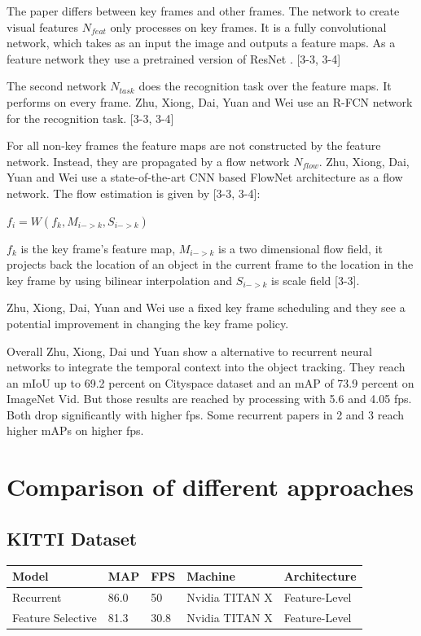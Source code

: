 \documentclass[conference]{IEEEtran}
\begin{document}
The paper differs between key frames and other frames. The network to create visual features $ N_{feat} $ only processes on key frames. It is a fully convolutional network, which takes as an input the image and outputs a feature maps. As a feature network they use a pretrained version of ResNet \cite{b40}. [3-3, 3-4] \newline

The second network $ N_{task} $ does the recognition task over the feature maps. It performs on every frame.  Zhu, Xiong, Dai, Yuan and Wei use an R-FCN \cite{b19} network for the recognition task. [3-3, 3-4]  \newline

For all non-key frames the feature maps are not constructed by the feature network. Instead, they are propagated by a flow network $ N_{flow} $.  Zhu, Xiong, Dai, Yuan and Wei use a state-of-the-art CNN based FlowNet architecture \cite{b57} as a flow network. The flow estimation is given by [3-3, 3-4]: \newline

$ f_{i} =  W (f_{k},M_{i->k}, S_{i->k})$ \newline

$ f_{k} $ is the key frame's feature map, $ M_{i->k} $ is a two dimensional flow field, it projects back the location of an object in the current frame to the location in the key frame by using bilinear interpolation and  $ S_{i->k} $ is scale field [3-3]. \newline

Zhu, Xiong, Dai, Yuan and Wei use a fixed key frame scheduling and they  see a potential improvement in changing the key frame policy. \newline

Overall Zhu, Xiong, Dai und Yuan show  a alternative  to recurrent neural networks to integrate the temporal context into the object tracking. They reach an mIoU up to 69.2 percent on Cityspace dataset and an mAP of 73.9 percent on ImageNet Vid. But those results are reached by processing with 5.6 and 4.05 fps. Both drop significantly with higher fps. Some recurrent papers in 2 and 3 reach higher mAPs on higher fps. 

\section{Comparison of different approaches}

\subsection{KITTI Dataset}
\begin{tabular}{ | p{2cm} | p{2em}| p{2em} | p{4em} | p{5em} | } 
 \hline
 Model & MAP & FPS & Machine & Architecture \\
 \hline
 Recurrent \cite{b1} & 86.0 & 50 & Nvidia TITAN X & Feature-Level \\
 \hline
 Feature Selective \cite{b6} & 81.3 & 30.8 & Nvidia TITAN X & Feature-Level \\
 \hline
\end{tabular} \newline
\end{document}
